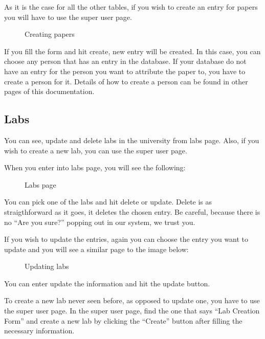 \documentclass[letterpaper,10pt,english]{sphinxmanual}
\begin{document}
As it is the case for all the other tables, if you wish to create an entry for papers you
will have to use the super user page.

\begin{figure}[htbp]
\centering
\capstart

\noindent{}
\caption{Creating papers}\label{\detokenize{user/kaplan:id4}}\end{figure}

If you fill the form and hit create, new entry will be created. In this case, you can choose any person
that has an entry in the database. If your database do not have an entry for the person you want to
attribute the paper to, you have to create a person for it. Details of how to create a person can be found
in other pages of this documentation.


\subsection{Labs}
\label{\detokenize{user/kaplan:labs}}
You can see, update and delete labs in the university from labs page. Also, if you wish to create a new lab,
you can use the super user page.

When you enter into labs page, you will see the following:

\begin{figure}[htbp]
\centering
\capstart

\noindent{}
\caption{Labs page}\label{\detokenize{user/kaplan:id5}}\end{figure}

You can pick one of the labs and hit delete or update. Delete is as straigthforward as it goes, it deletes the
chosen entry. Be careful, because there is no “Are you sure?” popping out in our system, we trust you.

If you wish to update the entries, again you can choose the entry you want to update and you will see a similar
page to the image below:

\begin{figure}[htbp]
\centering
\capstart

\noindent{}
\caption{Updating labs}\label{\detokenize{user/kaplan:id6}}\end{figure}

You can enter update the information and hit the update button.

To create a new lab never seen before, as opposed to update one, you have to use the super user page.
In the super user page, find the one that says “Lab Creation Form” and create a new lab by clicking
the “Create” button after filling the necessary information.
\end{document}

